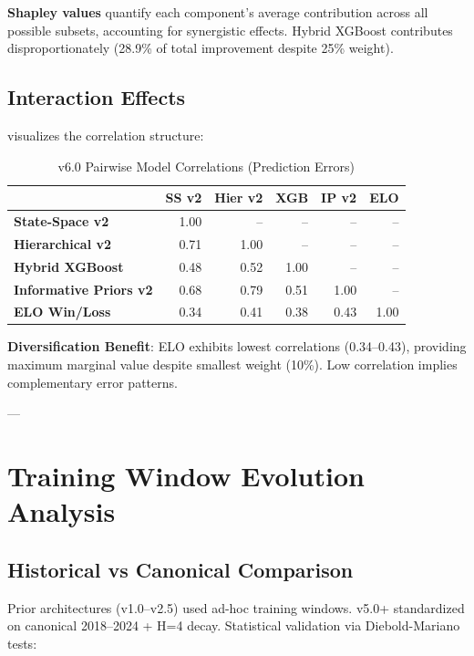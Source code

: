 \textbf{Shapley values} quantify each component's average contribution across all possible subsets, accounting for synergistic effects. Hybrid XGBoost contributes disproportionately (28.9\% of total improvement despite 25\% weight).

\subsection{Interaction Effects}

 visualizes the correlation structure:



\begin{table}[h]
\centering
\caption{v6.0 Pairwise Model Correlations (Prediction Errors)}
\label{tab:error-correlations}
\begin{tabular}{lrrrrr}
\toprule
& \textbf{SS v2} & \textbf{Hier v2} & \textbf{XGB} & \textbf{IP v2} & \textbf{ELO} \\
\midrule
\textbf{State-Space v2} & 1.00 & -- & -- & -- & -- \\
\textbf{Hierarchical v2} & 0.71 & 1.00 & -- & -- & -- \\
\textbf{Hybrid XGBoost} & 0.48 & 0.52 & 1.00 & -- & -- \\
\textbf{Informative Priors v2} & 0.68 & 0.79 & 0.51 & 1.00 & -- \\
\textbf{ELO Win/Loss} & 0.34 & 0.41 & 0.38 & 0.43 & 1.00 \\
\bottomrule
\end{tabular}
\end{table}

\textbf{Diversification Benefit}: ELO exhibits lowest correlations (0.34--0.43), providing maximum marginal value despite smallest weight (10\%). Low correlation implies complementary error patterns.

---

\section{Training Window Evolution Analysis}

\subsection{Historical vs Canonical Comparison}

Prior architectures (v1.0--v2.5) used ad-hoc training windows. v5.0+ standardized on canonical 2018--2024 + H=4 decay. Statistical validation via Diebold-Mariano tests:

